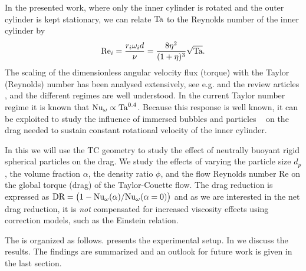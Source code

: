 In the presented work, where only the inner cylinder is rotated and the outer
cylinder is kept stationary, we can relate $\text{Ta}$ to the Reynolds number of
the inner cylinder by
\begin{equation}
\text{Re}_i = \frac{r_i \omega_i d}{\nu} = \frac{8\eta^2}{(1+\eta)^{3}} \sqrt{\text{Ta}}.
\end{equation}
\noindent The scaling of the dimensionless angular velocity flux (torque) with
the Taylor (Reynolds) number has been analysed extensively, see e.g.
\citep{Lathrop1992,Lewis1999,Paoletti2011,vanGils2011,Ostilla-Monico2013} and
the review articles \citep{Fardin2014,Grossmann2016}, and the
different regimes are well understood. In the current Taylor number regime it
is known that $\text{Nu}_\omega \propto \text{Ta}^{0.4}$. Because this response is
well known, it can be exploited to study the influence of immersed bubbles and
particles
~\citep{vandenBerg2005,vandenBerg2007,vanGils2013,Maryami2014,Verschoof2016}
on the drag needed to sustain constant rotational velocity of the inner
cylinder. 

In this \docname we will use the TC geometry to study the effect of neutrally
buoyant rigid spherical particles on the drag. We study the effects of varying
the particle size $d_p$, the volume fraction $\alpha$, the density ratio
$\phi$, and the flow Reynolds number $\text{Re}$ on the global torque (drag)
of the Taylor-Couette flow. The drag reduction is expressed as $\text{DR} =
\left(1 - \text{Nu}_\omega(\alpha) / \text{Nu}_\omega(\alpha=0) \right)$ and as we are
interested in the net drag reduction, it is \emph{not} compensated for
increased viscosity effects using correction models, such as the Einstein
relation.

The \docname is organized as follows. 
presents the experimental setup. In  we discuss the
results. The findings are summarized and an outlook for future work is given
in the last section.

